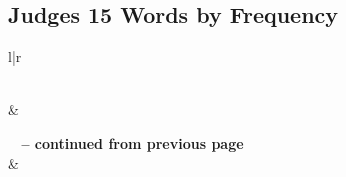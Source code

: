 

\subsection{Judges 15 Words by Frequency}


\normalsize
 
\begin{center}
\begin{longtable}{l|r}
\caption[Judges 15 Words by Frequency]{Judges 15 Words by Frequency}\label{table:WordsbyFrequency for Judges 15} \\
\hline {} &  \\ \hline 
\endfirsthead
 
{{\bfseries \tablename\ \thetable{} -- continued from previous page}} \\  
\hline {} &  \\ \hline 
\endhead
 

\end{longtable}
\end{center}
